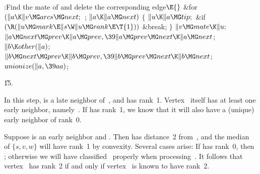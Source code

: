\Y\B\4:Find the mate of  and delete the corresponding edge\X${}%
\E{}$\6
\&{for} ${}(\|a\K\|v\MG\\{arcs}\MG\\{next};{}$  ; ${}\|a\K\|a\MG\\{next}){}$\5
${}\{{}$\1\6
${}\|u\K\|a\MG\\{tip};{}$\6
\&{if} ${}(\R(\|u\MG\\{mark}\E\|s\W\|u\MG\\{rank}\E\T{1})){}$\1\5
\&{break};\2\6
\4${}\}{}$\2\6
${}\|v\MG\\{mate}\K\|u;{}$\6
${}\|a\MG\\{next}\MG\\{prev}\K\|a\MG\\{prev},\39\|a\MG\\{prev}\MG\\{next}\K\|a%
\MG\\{next}{}$;\6
${}\|b\K\\{other}(\|a){}$;\6
${}\|b\MG\\{next}\MG\\{prev}\K\|b\MG\\{prev},\39\|b\MG\\{prev}\MG\\{next}\K\|b%
\MG\\{next}{}$;\6
${}\\{unionize}(\|a,\39\\{aa}){}$;\par
\U15.\fi

In this step,  is a late neighbor of~, and  has
rank~1. Vertex~ itself has at least one early neighbor,
namely~. If  has rank~1, we know that it will also have a
(unique)
early neighbor of rank~0.

Suppose  is an early neighbor and . Then  has
distance~2
from~, and the median~ of $\{s,v,w\}$ will have rank~1
by convexity. Several cases arise: If  has rank~0, then ;
otherwise we will have classified~ properly when processing~.
It follows that vertex~ has rank~2 if and only if
vertex~ is known to have rank~2.

